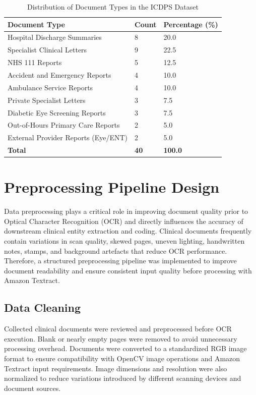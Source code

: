 \begin{table}[htbp]
\centering
\caption{Distribution of Document Types in the ICDPS Dataset}
\label{tab:document_type_distribution}
\begin{tabular}{|p{8cm}|p{2cm}|p{3cm}|}
\hline
\textbf{Document Type} & \textbf{Count} & \textbf{Percentage (\%)} \\
\hline
Hospital Discharge Summaries & 8 & 20.0 \\
\hline
Specialist Clinical Letters & 9 & 22.5 \\
\hline
NHS 111 Reports & 5 & 12.5 \\
\hline
Accident and Emergency Reports & 4 & 10.0 \\
\hline
Ambulance Service Reports & 4 & 10.0 \\
\hline
Private Specialist Letters & 3 & 7.5 \\
\hline
Diabetic Eye Screening Reports & 3 & 7.5 \\
\hline
Out-of-Hours Primary Care Reports & 2 & 5.0 \\
\hline
External Provider Reports (Eye/ENT) & 2 & 5.0 \\
\hline
\textbf{Total} & \textbf{40} & \textbf{100.0} \\
\hline
\end{tabular}
\end{table}

\section{Preprocessing Pipeline Design}

Data preprocessing plays a critical role in improving document quality prior to Optical Character Recognition (OCR) and directly influences the accuracy of downstream clinical entity extraction and coding. Clinical documents frequently contain variations in scan quality, skewed pages, uneven lighting, handwritten notes, stamps, and background artefacts that reduce OCR performance. Therefore, a structured preprocessing pipeline was implemented to improve document readability and ensure consistent input quality before processing with Amazon Textract.

\subsection{Data Cleaning}

Collected clinical documents were reviewed and preprocessed before OCR execution. Blank or nearly empty pages were removed to avoid unnecessary processing overhead. Documents were converted to a standardized RGB image format to ensure compatibility with OpenCV image operations and Amazon Textract input requirements. Image dimensions and resolution were also normalized to reduce variations introduced by different scanning devices and document sources.

